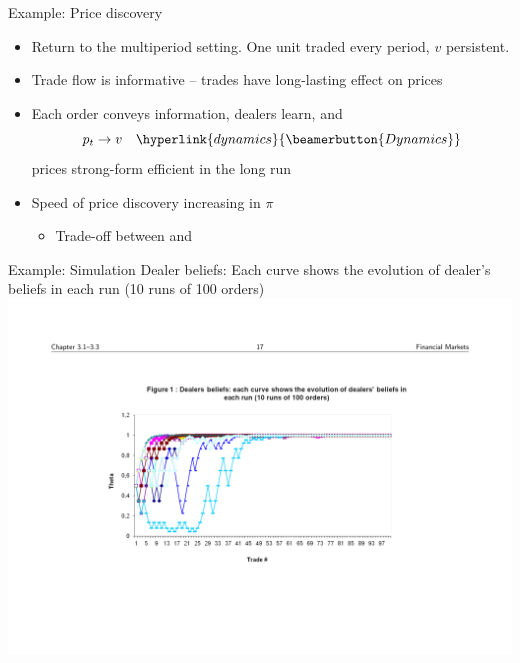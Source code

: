 \documentclass[english,10pt
,aspectratio=169
]{beamer}
\begin{document}


\begin{frame}[label=example]{Example: Price discovery}
\begin{itemize}
	\item Return to the multiperiod setting. One unit traded every period, $v$ persistent.
	\item Trade flow is \alert{informative} -- trades have long-lasting effect on prices
	\item Each order conveys information, dealers learn, and 
	$$p_t \rightarrow v \quad
	\hyperlink{dynamics}{\beamerbutton{Dynamics}} $$
	prices \alert{strong-form efficient} in the long run
	\pause
	\item Speed of price discovery increasing in $\pi$
	\begin{itemize}
		\item Trade-off between  and 
	\end{itemize}
\end{itemize}
\end{frame}


\begin{frame}{Example: Simulation}
	Dealer beliefs: Each curve shows the evolution of dealer's beliefs in each run (10 runs of 100 orders)
	\quad
	\center
	\includegraphics[width=0.95\linewidth]{pics/DealerBeliefs_Image.pdf}
\end{frame}
\end{document}
